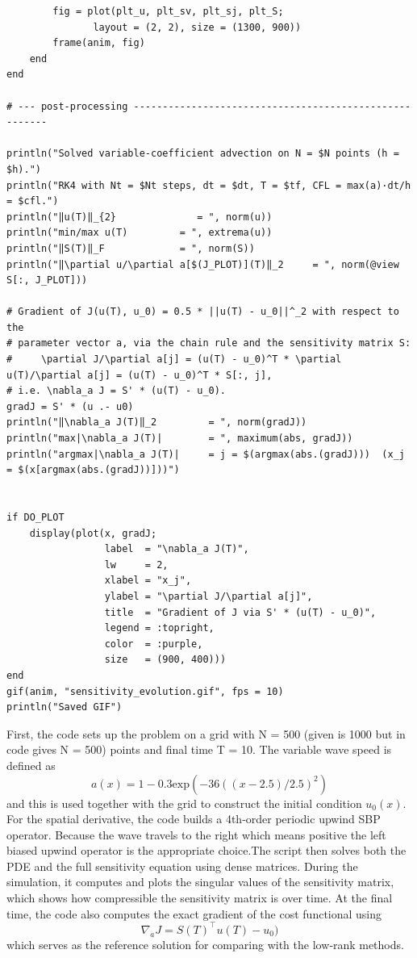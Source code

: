 \documentclass[11pt]{article}
\begin{document}
\begin{verbatim}
        fig = plot(plt_u, plt_sv, plt_sj, plt_S;
               layout = (2, 2), size = (1300, 900))
        frame(anim, fig)             
    end
end

# --- post-processing -------------------------------------------------------

println("Solved variable-coefficient advection on N = $N points (h = $h).")
println("RK4 with Nt = $Nt steps, dt = $dt, T = $tf, CFL = max(a)·dt/h = $cfl.")
println("‖u(T)‖_{2}              = ", norm(u))
println("min/max u(T)         = ", extrema(u))
println("‖S(T)‖_F             = ", norm(S))
println("‖\partial u/\partial a[$(J_PLOT)](T)‖_2     = ", norm(@view S[:, J_PLOT]))

# Gradient of J(u(T), u_0) = 0.5 * ||u(T) - u_0||^_2 with respect to the
# parameter vector a, via the chain rule and the sensitivity matrix S:
#     \partial J/\partial a[j] = (u(T) - u_0)^T * \partial u(T)/\partial a[j] = (u(T) - u_0)^T * S[:, j],
# i.e. \nabla_a J = S' * (u(T) - u_0).
gradJ = S' * (u .- u0)
println("‖\nabla_a J(T)‖_2         = ", norm(gradJ))
println("max|\nabla_a J(T)|        = ", maximum(abs, gradJ))
println("argmax|\nabla_a J(T)|     = j = $(argmax(abs.(gradJ)))  (x_j = $(x[argmax(abs.(gradJ))]))")


if DO_PLOT
    display(plot(x, gradJ;
                 label  = "\nabla_a J(T)",
                 lw     = 2,
                 xlabel = "x_j",
                 ylabel = "\partial J/\partial a[j]",
                 title  = "Gradient of J via S' * (u(T) - u_0)",
                 legend = :topright,
                 color  = :purple,
                 size   = (900, 400)))
end
gif(anim, "sensitivity_evolution.gif", fps = 10)
println("Saved GIF")
\end{verbatim}

First, the code sets up the problem on a grid with 
N = 500 (given is 1000 but in code gives N = 500)
 points and final time 
T = 10. The variable wave speed is defined as
\[
a(x) = 1 - 0.3\text{exp}(-36((x-2.5)/2.5)^2)
\]
and this is used together with the grid to construct the initial condition $u_0(x)$. For the spatial derivative, the code builds a 4th‑order periodic upwind SBP operator. Because the wave travels to the right which means positive the left biased upwind operator is the appropriate choice.The script then solves both the PDE and the full sensitivity equation using dense matrices. During the simulation, it computes and plots the singular values of the sensitivity matrix, which shows how compressible the sensitivity matrix is over time. At the final time, the code also computes the exact gradient of the cost functional using
\[
\nabla _a J = S(T)^\top u(T)-u_0
)
\]
which serves as the reference solution for comparing with the low‑rank methods.
\end{document}
